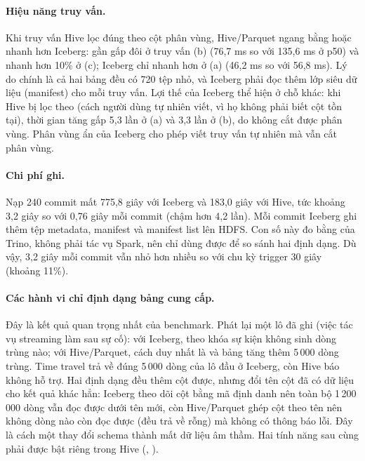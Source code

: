 \paragraph{Hiệu năng truy vấn.} Khi truy vấn Hive lọc đúng theo cột phân vùng, Hive/Parquet ngang bằng hoặc nhanh hơn Iceberg: gần gấp đôi ở truy vấn (b) (76,7 ms so với 135,6 ms ở p50) và nhanh hơn 10\% ở (c); Iceberg chỉ nhanh hơn ở (a) (46,2 ms so với 56,8 ms). Lý do chính là cả hai bảng đều có 720 tệp nhỏ, và Iceberg phải đọc thêm lớp siêu dữ liệu (manifest) cho mỗi truy vấn. Lợi thế của Iceberg thể hiện ở chỗ khác: khi Hive bị lọc theo  (cách người dùng tự nhiên viết, vì họ không phải biết cột  tồn tại), thời gian tăng gấp 5,3 lần ở (a) và 3,3 lần ở (b), do không cắt được phân vùng. Phân vùng ẩn của Iceberg cho phép viết truy vấn tự nhiên mà vẫn cắt phân vùng.

\paragraph{Chi phí ghi.} Nạp 240 commit mất 775,8 giây với Iceberg và 183,0 giây với Hive, tức khoảng 3,2 giây so với 0,76 giây mỗi commit (chậm hơn 4,2 lần). Mỗi commit Iceberg ghi thêm tệp metadata, manifest và manifest list lên HDFS. Con số này đo bằng  của Trino, không phải tác vụ Spark, nên chỉ dùng được để so sánh hai định dạng. Dù vậy, 3,2 giây mỗi commit vẫn nhỏ hơn nhiều so với chu kỳ trigger 30 giây (khoảng 11\%).

\paragraph{Các hành vi chỉ định dạng bảng cung cấp.} Đây là kết quả quan trọng nhất của benchmark. Phát lại một lô đã ghi (việc tác vụ streaming làm sau sự cố): với Iceberg,  theo khóa sự kiện không sinh dòng trùng nào; với Hive/Parquet, cách duy nhất là  và bảng tăng thêm 5\,000 dòng trùng. Time travel trả về đúng 5\,000 dòng của lô đầu ở Iceberg, còn Hive báo không hỗ trợ. Hai định dạng đều thêm cột được, nhưng đổi tên cột đã có dữ liệu cho kết quả khác hẳn: Iceberg theo dõi cột bằng mã định danh nên toàn bộ 1\,200\,000 dòng vẫn đọc được dưới tên mới, còn Hive/Parquet ghép cột theo tên nên không dòng nào còn đọc được (đều trả về rỗng) mà không có thông báo lỗi. Đây là cách một thay đổi schema thành mất dữ liệu âm thầm. Hai tính năng sau cùng phải được bật riêng trong Hive (, ).

